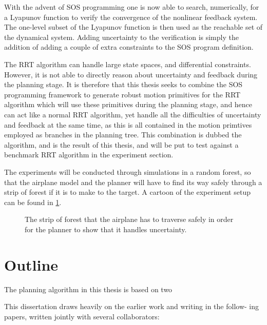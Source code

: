 With the advent of \ac{SOS} programming one is now able to search, numerically,
for a Lyapunov function to verify the convergence of the nonlinear feedback
system. The one-level subset of the Lyapunov function is then used as the
reachable set of the dynamical system. Adding uncertainty to the verification is
simply the addition of adding a couple of extra constraints to the \ac{SOS}
program definition.

The \ac{RRT} algorithm can handle large state spaces, and differential
constraints. However, it is not able to directly reason about uncertainty and
feedback during the planning stage. It is therefore that this thesis seeks to
combine the \ac{SOS} programming framework to generate robust motion primitives
for the \ac{RRT} algorithm which will use these primitives during the planning
stage, and hence can act like a normal \ac{RRT} algorithm, yet handle all the
difficulties of uncertainty and feedback at the same time, as this is all
contained in the motion primtives employed as branches in the planning tree.
This combination is dubbed the \rrtfunnel{} algorithm, and is the result of this
thesis, and will be put to test against a benchmark \ac{RRT} algorithm in the
experiment section.


The experiments will be conducted through simulations in a random forest, so
that the airplane model and the planner will have to find its way safely through
a strip of forest if it is to make to the target. A cartoon of the experiment
setup can be found in \cref{fig:experiment-cartoon}.

\begin{figure}
  \centering
  \caption{The strip of forest that the airplane has to traverse safely in order
  for the planner to show that it handles uncertainty.}
\label{fig:experiment-cartoon}
\end{figure} 



\section{Outline}

The planning algorithm in this thesis is based on two 

This dissertation draws heavily on the earlier work and writing in the follow-
ing papers, written jointly with several collaborators:

\cite{majumdarFunnelLibrariesRealtime2017}


